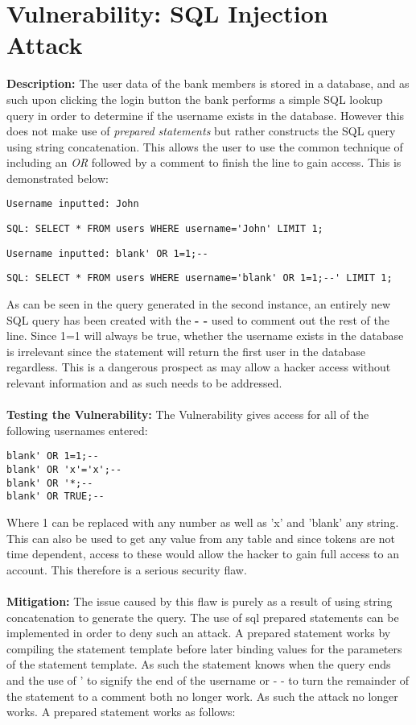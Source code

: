 
\section{Vulnerability: SQL Injection Attack}
\label{sec:background}
\textbf{Description:} The user data of the bank members is stored in a database, and as such upon clicking the login button the bank performs a simple SQL lookup query in order to
determine if the username exists in the database. However this does not make use of \textit{prepared statements} but rather constructs the SQL query using string concatenation.
This allows the user to use the common technique of including an \textit{OR} followed by a comment to finish the line to gain access. This is demonstrated below:
\begin{verbatim}
Username inputted: John
\end{verbatim}
\begin{verbatim}
SQL: SELECT * FROM users WHERE username='John' LIMIT 1;
\end{verbatim}
\begin{verbatim}
Username inputted: blank' OR 1=1;--
\end{verbatim}
\begin{verbatim}
SQL: SELECT * FROM users WHERE username='blank' OR 1=1;--' LIMIT 1;
\end{verbatim}
As can be seen in the query generated in the second instance, an entirely new SQL query has been created with the \textbf{- -} used to comment out the rest of the line.
Since 1=1 will always be true, whether the username exists in the database is irrelevant since the statement will return the first user in the database regardless. This is a dangerous
prospect as may allow a hacker access without relevant information and as such needs to be addressed.\\ \\
\textbf{Testing the Vulnerability:} The Vulnerability gives access for all of the following usernames entered:
 
\begin{verbatim}
blank' OR 1=1;--
blank' OR 'x'='x';--
blank' OR '*;--
blank' OR TRUE;--
\end{verbatim}
Where 1 can be replaced with any number as well as 'x' and 'blank' any string. This can also be used to get any value from any table and since tokens are not time dependent, access
to these would allow the hacker to gain full access to an account. This therefore is a serious security flaw.\\ \\
\textbf{Mitigation:} The issue caused by this flaw is purely as a result of using string concatenation to generate the query. The use of sql prepared statements can be implemented in order
to deny such an attack. A prepared statement works by compiling the statement template before later binding values for the parameters of the statement template. As such the statement knows
when the query ends and  the use of ' to signify the end of the username or - - to turn the remainder of the statement to a comment both no longer work. As such the attack no longer works. A
prepared statement works as follows:\\
 

